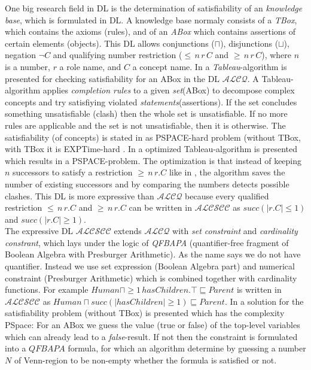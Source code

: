 \documentclass[a4paper,11pt]{scrartcl}
\theoremstyle{break}
\theoremstyle{definition}
\begin{document}
One big research field in DL is the determination of satisfiability of an \textit{knowledge base}, which is formulated in DL. A knowledge base normaly consists of a \textit{TBox}, which contains the axioms (rules), and of an \textit{ABox} which contains assertions of certain elements (objects). This DL allows conjunctions ($\sqcap$), disjunctions ($\sqcup$), negation $\neg C$ and qualifying number restriction ($\leq\,n\,r\, C$ and $\geq \, n\, r\, C$), where $n$ is a number, $r$ a role name, and $C$ a concept name. In \cite{1} a \textit{Tableau}-algorithm is presented for checking satisfiability for an ABox in the DL $\mathcal{ALCQ}$. A Tableau-algorithm applies \textit{completion rules} to a given \textit{set}(ABox) to decompose complex concepts and try satisfiying violated \textit{statements}(assertions). If the set concludes something unsatisfiable (clash) then the whole set is unsatisfiable. If no more rules are applicable and the set is not unsatisfiable, then it is otherwise. The satisfiability (of concepts) is stated in \cite{1} as PSPACE-hard problem (without TBox, with TBox it is EXPTime-hard \cite{4}. In \cite{pspace} a optimized Tableau-algorithm is presented which results in a PSPACE-problem. The optimization is that instead of keeping $n$ successors to satisfy a restriction $\geq\,n\,r.C$ like in \cite{1}, the algorithm saves the number of existing successors and by comparing the numbers detects possible clashes. This DL is more expressive than $\mathcal{ALCQ}$ because every qualified restriction $\leq\,n\,r.C$ and $\geq \, n\, r.C$ can be written in $\mathcal{ALCSCC}$ as $succ(|r.C|\leq 1)$ and $succ(|r.C|\geq 1)$. \\
The expressive DL $\mathcal{ALCSCC}$ extends $\mathcal{ALCQ}$ with \textit{set constraint} and \textit{cardinality constrant}, which lays under the logic of \textit{QFBAPA} (quantifier-free fragment of Boolean Algebra with Presburger Arithmetic). As the name says we do not have quantifier. Instead we use set expression (Boolean Algebra part) and numerical constraint (Presburger Arithmetic) which is combined together with cardinality functions. For example $Human\sqcap \geq 1\,hasChildren.\top\sqsubseteq Parent$ is written in $\mathcal{ALCSCC}$ as $Human\sqcap succ(|hasChildren|\geq 1)\sqsubseteq Parent$. In \cite{4} a solution for the satisfiability problem (without TBox) is presented which has the complexity PSpace: For an ABox we guess the value (true or false) of the top-level variables which can already lead to a \textit{false}-result. If not then the constraint is formulated into a $QFBAPA$ formula, for which an algorithm determine by guessing a number $N$ of Venn-region to be non-empty whether the formula is satisfied or not.\\
\end{document}
